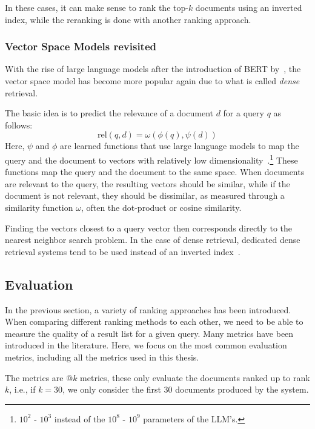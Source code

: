 In these cases, it can make sense to rank the top-$k$ documents using an inverted index, while the reranking is done with another ranking approach.

\subsubsection{Vector Space Models revisited}
With the rise of large language models after the introduction of BERT by~\cite{BERT}, the vector space model has become more popular again due to what is called \emph{dense} retrieval.  

The basic idea is to predict the relevance of a document $d$ for a query $q$ as follows:
\begin{equation}
	\text{rel}(q, d) = \omega\left(\phi\left(q\right),
	\psi\left(d\right)\right)
\end{equation}
Here, $\psi$ and $\phi$ are learned functions that use large language models to map the query and the document to vectors with relatively low dimensionality~\citep{seperation-logical-physical}.\footnote{$10^2$ - $10^3$ instead of the $10^8$ - $10^9$ parameters of the LLM's.} These functions map the query and the document to the same space. When documents are relevant to the query, the resulting vectors should be similar, while if the document is not relevant, they should be dissimilar, as measured through a similarity function $\omega$, often the dot-product or cosine similarity.

Finding the vectors closest to a query vector then corresponds directly to the nearest neighbor search problem. In the case of dense retrieval, dedicated dense retrieval systems tend to be used instead of an inverted index~\citep{faiss}. 

\subsection{Evaluation}
\label{sec:evaluation}
In the previous section, a variety of ranking approaches has been introduced. When comparing different ranking methods to each other, we need to be able to measure the quality of a result list for a given query. Many metrics have been introduced in the literature. Here, we focus on the most common evaluation metrics, including all the metrics used in this thesis. 

The metrics are $@k$ metrics, these only evaluate the documents ranked up to rank $k$, i.e., if $k=30$, we only consider the first $30$ documents produced by the system.

